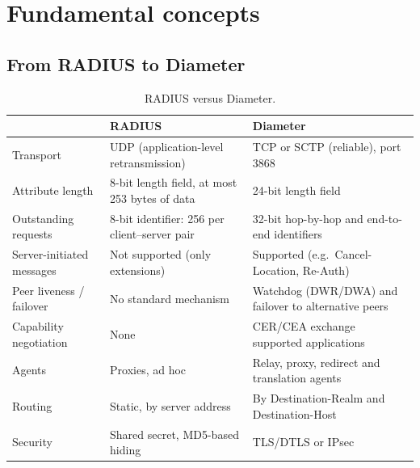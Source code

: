 \documentclass[11pt,a4paper]{article}
\begin{document}
\section{Fundamental concepts}

\subsection{From RADIUS to Diameter}
\begin{table}[htbp]
\centering\small
\caption{RADIUS versus Diameter.}\label{tab:radius}
\begin{tabularx}{\linewidth}{@{}l Y Y@{}}
\toprule
{} & RADIUS & Diameter \\
\midrule
Transport              & UDP (application-level retransmission) & TCP or SCTP (reliable), port 3868 \\
Attribute length       & 8-bit length field, at most 253 bytes of data & 24-bit length field \\
Outstanding requests   & 8-bit identifier: 256 per client--server pair & 32-bit hop-by-hop and end-to-end identifiers \\
Server-initiated messages & Not supported (only extensions)     & Supported (e.g.\ Cancel-Location, Re-Auth) \\
Peer liveness / failover & No standard mechanism              & Watchdog (DWR/DWA) and failover to alternative peers \\
Capability negotiation & None                                   & CER/CEA exchange supported applications \\
Agents                 & Proxies, ad hoc                        & Relay, proxy, redirect and translation agents \\
Routing                & Static, by server address              & By Destination-Realm and Destination-Host \\
Security               & Shared secret, MD5-based hiding         & TLS/DTLS or IPsec \\
\bottomrule
\end{tabularx}
\end{table}
\end{document}

